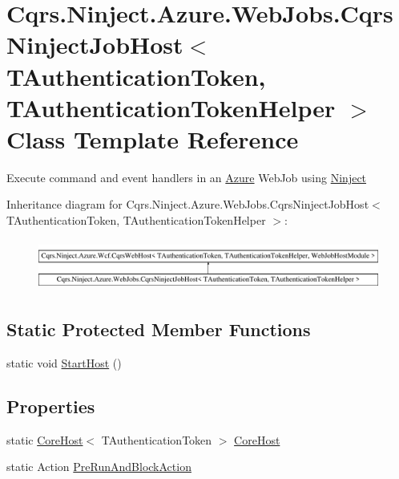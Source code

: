\hypertarget{classCqrs_1_1Ninject_1_1Azure_1_1WebJobs_1_1CqrsNinjectJobHost}{}\section{Cqrs.\+Ninject.\+Azure.\+Web\+Jobs.\+Cqrs\+Ninject\+Job\+Host$<$ T\+Authentication\+Token, T\+Authentication\+Token\+Helper $>$ Class Template Reference}
\label{classCqrs_1_1Ninject_1_1Azure_1_1WebJobs_1_1CqrsNinjectJobHost}


Execute command and event handlers in an \hyperlink{namespaceCqrs_1_1Ninject_1_1Azure}{Azure} Web\+Job using \hyperlink{namespaceCqrs_1_1Ninject}{Ninject}  


Inheritance diagram for Cqrs.\+Ninject.\+Azure.\+Web\+Jobs.\+Cqrs\+Ninject\+Job\+Host$<$ T\+Authentication\+Token, T\+Authentication\+Token\+Helper $>$\+:\begin{figure}[H]
\begin{center}
\leavevmode
\includegraphics[height=1.676647cm]{classCqrs_1_1Ninject_1_1Azure_1_1WebJobs_1_1CqrsNinjectJobHost}
\end{center}
\end{figure}
\subsection*{Static Protected Member Functions}
\begin{DoxyCompactItemize}
\item 
static void \hyperlink{classCqrs_1_1Ninject_1_1Azure_1_1WebJobs_1_1CqrsNinjectJobHost_a9b7fb1deadaf625c21f1d7d55cd5752f_a9b7fb1deadaf625c21f1d7d55cd5752f}{Start\+Host} ()
\end{DoxyCompactItemize}
\subsection*{Properties}
\begin{DoxyCompactItemize}
\item 
static \hyperlink{classCqrs_1_1Hosts_1_1CoreHost}{Core\+Host}$<$ T\+Authentication\+Token $>$ \hyperlink{classCqrs_1_1Ninject_1_1Azure_1_1WebJobs_1_1CqrsNinjectJobHost_a2c166839548b7c238a9462b46bd8e555_a2c166839548b7c238a9462b46bd8e555}{Core\+Host}
\item 
static Action \hyperlink{classCqrs_1_1Ninject_1_1Azure_1_1WebJobs_1_1CqrsNinjectJobHost_a16eceaa51739d5baff6e4986ed822d8f_a16eceaa51739d5baff6e4986ed822d8f}{Pre\+Run\+And\+Block\+Action}
\end{DoxyCompactItemize}


